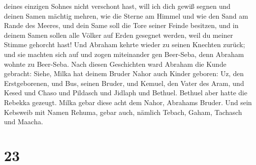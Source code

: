 deines einzigen Sohnes nicht verschont hast,  will ich
dich gewiß segnen und deinen Samen mächtig mehren, wie die Sterne am
Himmel und wie den Sand am Rande des Meeres, und dein Same soll die Tore
seiner Feinde besitzen,  und in deinem Samen sollen alle
Völker auf Erden gesegnet werden, weil du meiner Stimme gehorcht hast!
 Und Abraham kehrte wieder zu seinen Knechten zurück; und
sie machten sich auf und zogen miteinander gen Beer-Seba, denn Abraham
wohnte zu Beer-Seba.  Nach diesen Geschichten ward
Abraham die Kunde gebracht: Siehe, Milka hat deinem Bruder Nahor auch
Kinder geboren:  Uz, den Erstgeborenen, und Bus, seinen
Bruder, und Kemuel, den Vater des Aram,  und Kesed und
Chaso und Pildasch und Jidlaph und Bethuel.  Bethuel aber
hatte die Rebekka gezeugt. Milka gebar diese acht dem Nahor, Abrahams
Bruder.  Und sein Kebsweib mit Namen Rehuma, gebar auch,
nämlich Tebach, Gaham, Tachasch und Maacha.

\hypertarget{section-22}{%
\section{23}\label{section-22}}

